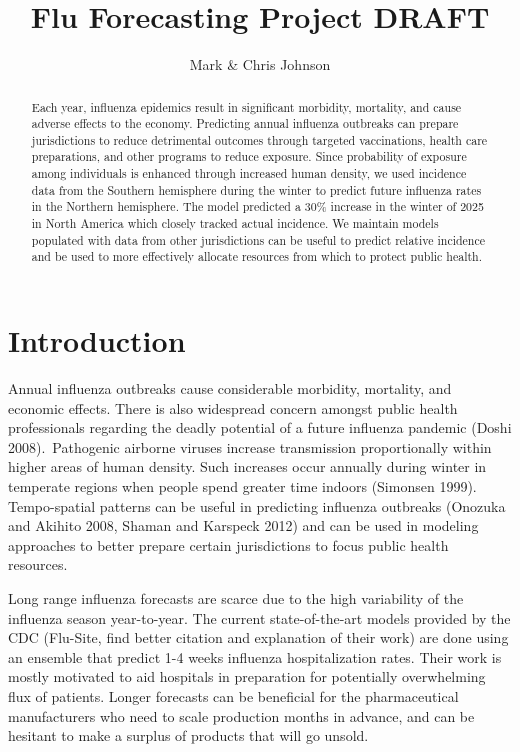 \documentclass[12pt,a4paper,english]{article}
\begin{document}
\title{Flu Forecasting Project DRAFT}
\author{Mark \& Chris Johnson}
\maketitle

\begin{abstract}
Each year, influenza epidemics result in significant morbidity, mortality, and cause adverse effects to the economy. Predicting annual influenza outbreaks can prepare jurisdictions to reduce detrimental outcomes through targeted vaccinations, health care preparations, and other programs to reduce exposure. Since probability of exposure among individuals is enhanced through increased human density, we used incidence data from the Southern hemisphere during the winter to predict future influenza rates in the Northern hemisphere. The model predicted a 30\% increase in the winter of 2025 in North America which closely tracked actual incidence. We maintain models populated with data from other jurisdictions can be useful to predict relative incidence and be used to more effectively allocate resources from which to protect public health.  
\end{abstract}

\section{Introduction}

Annual influenza outbreaks cause considerable morbidity, mortality, and economic effects. There is also widespread concern amongst public health professionals regarding the deadly potential of a future influenza pandemic (Doshi 2008). Pathogenic airborne viruses increase transmission proportionally within higher areas of human density. Such increases occur annually during winter in temperate regions when people spend greater time indoors (Simonsen 1999). Tempo-spatial patterns can be useful in predicting influenza outbreaks (Onozuka and Akihito 2008, Shaman and Karspeck 2012) and can be used in modeling approaches to better prepare certain jurisdictions to focus public health resources. 

Long range influenza forecasts are scarce due to the high variability of the influenza season year-to-year. The current state-of-the-art models provided by the CDC (Flu-Site, find better citation and explanation of their work) are done using an ensemble that predict 1-4 weeks influenza hospitalization rates. Their work is mostly motivated to aid hospitals in preparation for potentially overwhelming flux of patients. Longer forecasts can be beneficial for the pharmaceutical manufacturers who need to scale production months in advance, and can be hesitant to make a surplus of products that will go unsold. 
 
\end{document}
